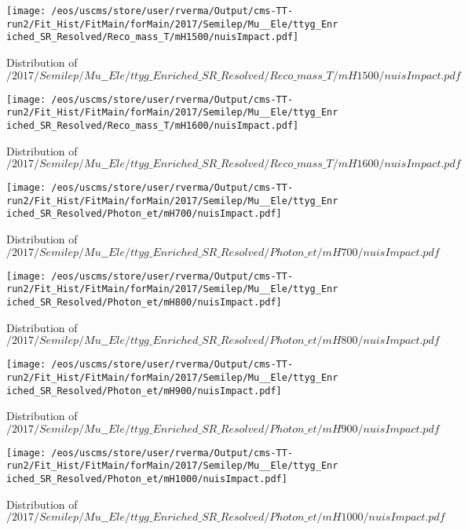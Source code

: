 \begin{figure}
\centering
\texttt{[image: /eos/uscms/store/user/rverma/Output/cms-TT-run2/Fit\_Hist/FitMain/forMain/2017/Semilep/Mu\_\_Ele/ttyg\_Enriched\_SR\_Resolved/Reco\_mass\_T/mH1500/nuisImpact.pdf]}
\caption{Distribution of $/2017/Semilep/Mu\_\_Ele/ttyg\_Enriched\_SR\_Resolved/Reco\_mass\_T/mH1500/nuisImpact.pdf$}
\end{figure}

\begin{figure}
\centering
\texttt{[image: /eos/uscms/store/user/rverma/Output/cms-TT-run2/Fit\_Hist/FitMain/forMain/2017/Semilep/Mu\_\_Ele/ttyg\_Enriched\_SR\_Resolved/Reco\_mass\_T/mH1600/nuisImpact.pdf]}
\caption{Distribution of $/2017/Semilep/Mu\_\_Ele/ttyg\_Enriched\_SR\_Resolved/Reco\_mass\_T/mH1600/nuisImpact.pdf$}
\end{figure}

\begin{figure}
\centering
\texttt{[image: /eos/uscms/store/user/rverma/Output/cms-TT-run2/Fit\_Hist/FitMain/forMain/2017/Semilep/Mu\_\_Ele/ttyg\_Enriched\_SR\_Resolved/Photon\_et/mH700/nuisImpact.pdf]}
\caption{Distribution of $/2017/Semilep/Mu\_\_Ele/ttyg\_Enriched\_SR\_Resolved/Photon\_et/mH700/nuisImpact.pdf$}
\end{figure}

\begin{figure}
\centering
\texttt{[image: /eos/uscms/store/user/rverma/Output/cms-TT-run2/Fit\_Hist/FitMain/forMain/2017/Semilep/Mu\_\_Ele/ttyg\_Enriched\_SR\_Resolved/Photon\_et/mH800/nuisImpact.pdf]}
\caption{Distribution of $/2017/Semilep/Mu\_\_Ele/ttyg\_Enriched\_SR\_Resolved/Photon\_et/mH800/nuisImpact.pdf$}
\end{figure}

\begin{figure}
\centering
\texttt{[image: /eos/uscms/store/user/rverma/Output/cms-TT-run2/Fit\_Hist/FitMain/forMain/2017/Semilep/Mu\_\_Ele/ttyg\_Enriched\_SR\_Resolved/Photon\_et/mH900/nuisImpact.pdf]}
\caption{Distribution of $/2017/Semilep/Mu\_\_Ele/ttyg\_Enriched\_SR\_Resolved/Photon\_et/mH900/nuisImpact.pdf$}
\end{figure}

\begin{figure}
\centering
\texttt{[image: /eos/uscms/store/user/rverma/Output/cms-TT-run2/Fit\_Hist/FitMain/forMain/2017/Semilep/Mu\_\_Ele/ttyg\_Enriched\_SR\_Resolved/Photon\_et/mH1000/nuisImpact.pdf]}
\caption{Distribution of $/2017/Semilep/Mu\_\_Ele/ttyg\_Enriched\_SR\_Resolved/Photon\_et/mH1000/nuisImpact.pdf$}
\end{figure}

